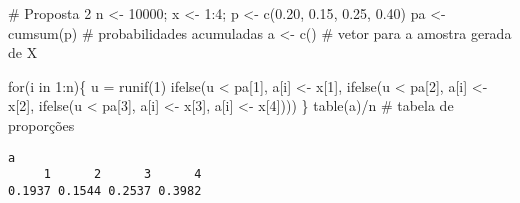 \documentclass[
  letterpaper,
  DIV=11,
  numbers=noendperiod]{scrreprt}
\newenvironment{Shaded}{\begin{snugshade}}{\end{snugshade}}
\newcommand{\CommentTok}[1]{\textcolor[rgb]{0.37,0.37,0.37}{#1}}
\newcommand{\ControlFlowTok}[1]{\textcolor[rgb]{0.00,0.23,0.31}{#1}}
\newcommand{\DecValTok}[1]{\textcolor[rgb]{0.68,0.00,0.00}{#1}}
\newcommand{\FloatTok}[1]{\textcolor[rgb]{0.68,0.00,0.00}{#1}}
\newcommand{\FunctionTok}[1]{\textcolor[rgb]{0.28,0.35,0.67}{#1}}
\newcommand{\NormalTok}[1]{\textcolor[rgb]{0.00,0.23,0.31}{#1}}
\newcommand{\OtherTok}[1]{\textcolor[rgb]{0.00,0.23,0.31}{#1}}
\newcommand{\SpecialCharTok}[1]{\textcolor[rgb]{0.37,0.37,0.37}{#1}}
\begin{document}
\begin{Shaded}
\begin{Highlighting}[]
\CommentTok{\# Proposta 2}
\NormalTok{n }\OtherTok{\textless{}{-}} \DecValTok{10000}\NormalTok{; }
\NormalTok{x }\OtherTok{\textless{}{-}} \DecValTok{1}\SpecialCharTok{:}\DecValTok{4}\NormalTok{; }
\NormalTok{p }\OtherTok{\textless{}{-}} \FunctionTok{c}\NormalTok{(}\FloatTok{0.20}\NormalTok{, }\FloatTok{0.15}\NormalTok{, }\FloatTok{0.25}\NormalTok{, }\FloatTok{0.40}\NormalTok{)}
\NormalTok{pa }\OtherTok{\textless{}{-}} \FunctionTok{cumsum}\NormalTok{(p) }\CommentTok{\# probabilidades acumuladas}
\NormalTok{a  }\OtherTok{\textless{}{-}} \FunctionTok{c}\NormalTok{() }\CommentTok{\# vetor para a amostra gerada de X}
        
\ControlFlowTok{for}\NormalTok{(i }\ControlFlowTok{in} \DecValTok{1}\SpecialCharTok{:}\NormalTok{n)\{}
\NormalTok{  u }\OtherTok{=} \FunctionTok{runif}\NormalTok{(}\DecValTok{1}\NormalTok{)}
  \FunctionTok{ifelse}\NormalTok{(u }\SpecialCharTok{\textless{}}\NormalTok{ pa[}\DecValTok{1}\NormalTok{], a[i] }\OtherTok{\textless{}{-}}\NormalTok{ x[}\DecValTok{1}\NormalTok{], }
    \FunctionTok{ifelse}\NormalTok{(u }\SpecialCharTok{\textless{}}\NormalTok{ pa[}\DecValTok{2}\NormalTok{], a[i] }\OtherTok{\textless{}{-}}\NormalTok{ x[}\DecValTok{2}\NormalTok{],}
      \FunctionTok{ifelse}\NormalTok{(u }\SpecialCharTok{\textless{}}\NormalTok{ pa[}\DecValTok{3}\NormalTok{], a[i] }\OtherTok{\textless{}{-}}\NormalTok{ x[}\DecValTok{3}\NormalTok{], a[i] }\OtherTok{\textless{}{-}}\NormalTok{ x[}\DecValTok{4}\NormalTok{])))}
\NormalTok{\}}
\FunctionTok{table}\NormalTok{(a)}\SpecialCharTok{/}\NormalTok{n }\CommentTok{\# tabela de proporções}
\end{Highlighting}
\end{Shaded}

\begin{verbatim}
a
     1      2      3      4 
0.1937 0.1544 0.2537 0.3982 
\end{verbatim}
\end{document}
